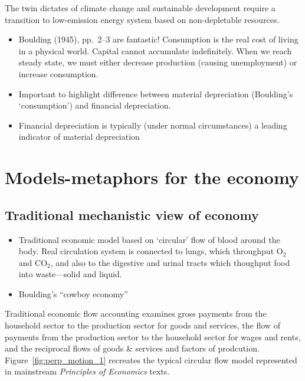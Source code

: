The twin dictates of climate change and 
sustainable development require a transition to 
low-emission energy system based on 
non-depletable resources. 

\begin{itemize}
\item{Boulding (1945)\cite{Boulding1945}, pp.\ 2--3 are fantastic! Consumption is the real cost of living in a physical
	world. Capital cannot accumulate indefinitely.
	When we reach steady state, we must either decrease production (causing unemployment)
	or increase consumption.}
	\item{Important to highlight difference between material depreciation (Boulding's `consumption') and financial depreciation.}
	\item{Financial depreciation is typically (under normal circumstances) a leading indicator of material depreciation}
\end{itemize}

\section{Models-metaphors for the economy}
\label{sec:metaphors}


\subsection{Traditional mechanistic view of economy}
\label{sec:mechanistic}

\begin{itemize}
	\item{Traditional economic model based on `circular' flow of blood around the body. 
	Real circulation system is connected to lungs, which throughput O$_2$ and CO$_2$, 
	and also to the digestive and urinal tracts which thoughput food into waste---solid and liquid.}
	\item{Boulding's ``cowboy economy''}
\end{itemize}

Traditional economic flow accounting examines gross payments 
from the household sector to the production sector for goods and services, the flow of payments from the production sector 
to the household sector for wages and rents, and the reciprocal flows of goods \& services and factors of prodcution. Figure~\ref{fig:perp_motion_1} 
recreates the typical circular flow model represented in mainstream \emph{Principles of Economics} texts.

